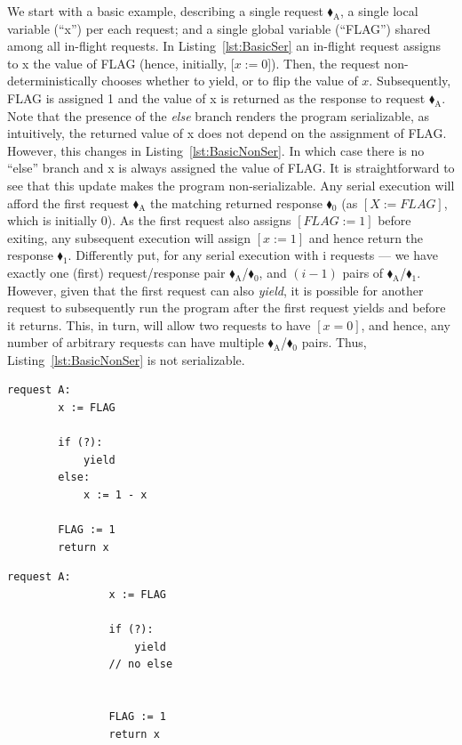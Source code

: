 We start with a basic example, describing a single request {\color{ForestGreen}$\blacklozenge_\text{A}$}, a single local variable (``x'') per each request; and a single global variable (``FLAG'') shared among all in-flight requests. 
%
In Listing~\ref{lst:BasicSer} an in-flight request assigns to x the value of FLAG (hence, initially, [$x:=0$]). Then, the request non-deterministically chooses whether to yield, or to flip the value of $x$. Subsequently, FLAG is assigned 1 and the value of x is returned as the response to request {\color{ForestGreen}$\blacklozenge_\text{A}$}. 
%
Note that the presence of the \textit{else} branch renders the program serializable, as intuitively, the returned value of x does not depend on the assignment of FLAG.
%
However, this changes in  Listing~\ref{lst:BasicNonSer}. In which case there is no ``else'' branch and x is always assigned the value of FLAG.
%
It is straightforward to see that this update makes the program non-serializable. Any serial execution will afford the first request {\color{ForestGreen}$\blacklozenge_\text{A}$} the matching returned response {\color{red}$\blacklozenge_0$} (as $[X:=FLAG]$, which is initially 0). As the first request also assigns $[FLAG:=1]$ before exiting, any subsequent execution will assign $[x:=1]$ and hence return the response {\color{red}$\blacklozenge_1$}. Differently put, for any serial execution with i requests --- we have exactly one (first) request/response pair {\color{ForestGreen}$\blacklozenge_\text{A}$}/{\color{red}$\blacklozenge_0$}, and $(i-1)$ pairs of {\color{ForestGreen}$\blacklozenge_\text{A}$}/{\color{red}$\blacklozenge_1$}.
%
However, given that the first request can also \textit{yield}, it is possible for another request to subsequently run the program after the first request yields and before it returns. This, in turn, will allow two requests to have $[x=0]$, and hence, any number of arbitrary requests can have multiple {\color{ForestGreen}$\blacklozenge_\text{A}$}/{\color{red}$\blacklozenge_0$} pairs. Thus, Listing~\ref{lst:BasicNonSer} is not serializable.





\noindent
\begin{minipage}[t]{0.45\textwidth}
	\begin{lstlisting}[caption={Serializable},
		label={lst:BasicSer}]
	request A: 
		x := FLAG
		
		if (?):
			yield
		else:
			x := 1 - x
		
		FLAG := 1
		return x
	\end{lstlisting}
\end{minipage}
\hfill
\begin{minipage}[t]{0.45\textwidth}
	\begin{lstlisting}[caption={Not serializable: {(A,0),(A,0)}},
	label={lst:BasicNonSer}]
			request A: 
			    x := FLAG 
			
			    if (?): 
			        yield
			    // no else
			
			
			    FLAG := 1 
			    return x
		\end{lstlisting}
\end{minipage}%

